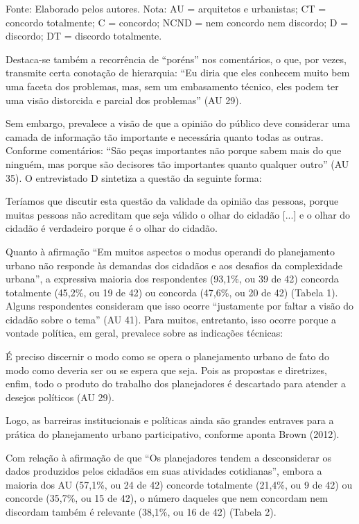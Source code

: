 \documentclass{article}
\begin{document}
Fonte: Elaborado pelos autores. Nota: AU = arquitetos e urbanistas;
CT = concordo totalmente; C = concordo; NCND = nem concordo nem
discordo; D = discordo; DT = discordo totalmente.

Destaca-se também a recorrência de “poréns” nos comentários, o que, por vezes,
transmite certa conotação de hierarquia: “Eu diria que eles conhecem
muito bem uma faceta dos problemas, mas, sem um embasamento técnico, eles
podem ter uma visão distorcida e parcial dos problemas” (AU
29).

Sem embargo, prevalece a visão de que a opinião do público deve considerar uma
camada de informação tão importante e necessária quanto todas as outras.
Conforme comentários: “São peças importantes não porque sabem mais do
que ninguém, mas porque são decisores tão importantes quanto qualquer
outro” (AU 35). O entrevistado D sintetiza a questão da seguinte
forma:

Teríamos que discutir esta questão da validade da opinião das pessoas, porque
muitas pessoas não acreditam que seja válido o olhar do cidadão
[...] e o olhar do cidadão é verdadeiro porque é o
olhar do cidadão.

Quanto à afirmação “Em muitos aspectos o modus operandi do planejamento
urbano não responde às demandas dos cidadãos e aos desafios da complexidade
urbana”, a expressiva maioria dos respondentes (93,1\%, ou 39 de 42)
concorda totalmente (45,2\%, ou 19 de 42) ou concorda (47,6\%, ou 20 de 42)
(Tabela 1). Alguns respondentes consideram
que isso ocorre “justamente por faltar a visão do cidadão sobre o
tema” (AU 41). Para muitos, entretanto, isso ocorre porque a
vontade política, em geral, prevalece sobre as indicações técnicas:

É preciso discernir o modo como se opera o planejamento urbano de fato do
modo como deveria ser ou se espera que seja. Pois as propostas e diretrizes,
enfim, todo o produto do trabalho dos planejadores é descartado para atender
a desejos políticos (AU 29).

Logo, as barreiras institucionais e políticas ainda são grandes entraves para a
prática do planejamento urbano participativo, conforme aponta Brown (2012).

Com relação à afirmação de que “Os planejadores tendem a desconsiderar os
dados produzidos pelos cidadãos em suas atividades cotidianas”,
embora a maioria dos AU (57,1\%, ou 24 de 42) concorde totalmente (21,4\%, ou 9
de
42) ou concorde (35,7\%, ou 15 de 42), o número daqueles que nem concordam nem
discordam também é relevante (38,1\%, ou 16 de 42) (Tabela 2).
\end{document}
